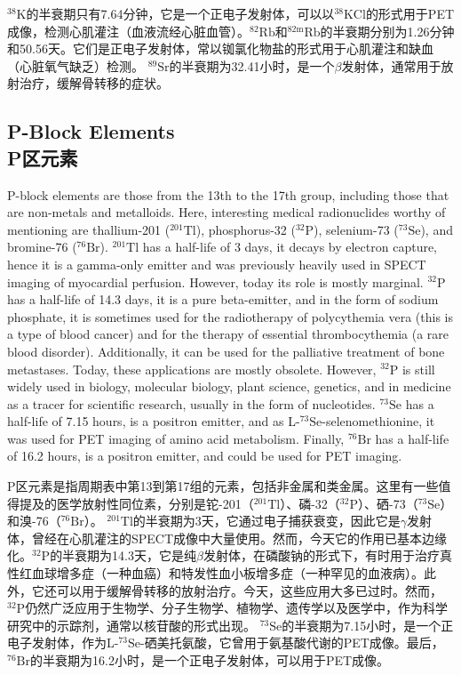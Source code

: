 \documentclass[dvipsnames, svgnames,a4paper,11pt]{article}
\begin{document}
\(\mathrm{^{38}K}\)的半衰期只有7.64分钟，它是一个正电子发射体，可以以\(\mathrm{^{38}KCl}\)的形式用于PET成像，检测心肌灌注（血液流经心脏血管）。\(\mathrm{^{82}Rb}\)和\(\mathrm{^{82m}Rb}\)的半衰期分别为1.26分钟和50.56天。它们是正电子发射体，常以铷氯化物盐的形式用于心肌灌注和缺血（心脏氧气缺乏）检测。 \(\mathrm{^{89}Sr}\)的半衰期为32.41小时，是一个$\beta$发射体，通常用于放射治疗，缓解骨转移的症状。

\subsection{P-Block Elements \\P区元素}

P-block elements are those from the 13th to the 17th group, including those that are non-metals and metalloids. Here, interesting medical radionuclides worthy of mentioning are thallium-201 (\(\mathrm{^{201}Tl}\)), phosphorus-32 (\(\mathrm{^{32}P}\)), selenium-73 (\(\mathrm{^{73}Se}\)), and bromine-76 (\(\mathrm{^{76}Br}\)). \(\mathrm{^{201}Tl}\) has a half-life of 3 days, it decays by electron capture, hence it is a gamma-only emitter and was previously heavily used in SPECT imaging of myocardial perfusion. However, today its role is mostly marginal. \(\mathrm{^{32}P}\) has a half-life of 14.3 days, it is a pure beta-emitter, and in the form of sodium phosphate, it is sometimes used for the radiotherapy of polycythemia vera (this is a type of blood cancer) and for the therapy of essential thrombocythemia (a rare blood disorder). Additionally, it can be used for the palliative treatment of bone metastases. Today, these applications are mostly obsolete. However, \(\mathrm{^{32}P}\) is still widely used in biology, molecular biology, plant science, genetics, and in medicine as a tracer for scientific research, usually in the form of nucleotides. \(\mathrm{^{73}Se}\) has a half-life of 7.15 hours, is a positron emitter, and as L-\(\mathrm{^{73}Se}\)-selenomethionine, it was used for PET imaging of amino acid metabolism. Finally, \(\mathrm{^{76}Br}\) has a half-life of 16.2 hours, is a positron emitter, and could be used for PET imaging.

P区元素是指周期表中第13到第17组的元素，包括非金属和类金属。这里有一些值得提及的医学放射性同位素，分别是铊-201（\(\mathrm{^{201}Tl}\)）、磷-32（\(\mathrm{^{32}P}\)）、硒-73（\(\mathrm{^{73}Se}\)）和溴-76（\(\mathrm{^{76}Br}\)）。 \(\mathrm{^{201}Tl}\)的半衰期为3天，它通过电子捕获衰变，因此它是$\gamma$发射体，曾经在心肌灌注的SPECT成像中大量使用。然而，今天它的作用已基本边缘化。\(\mathrm{^{32}P}\)的半衰期为14.3天，它是纯$\beta$发射体，在磷酸钠的形式下，有时用于治疗真性红血球增多症（一种血癌）和特发性血小板增多症（一种罕见的血液病）。此外，它还可以用于缓解骨转移的放射治疗。今天，这些应用大多已过时。然而，\(\mathrm{^{32}P}\)仍然广泛应用于生物学、分子生物学、植物学、遗传学以及医学中，作为科学研究中的示踪剂，通常以核苷酸的形式出现。 \(\mathrm{^{73}Se}\)的半衰期为7.15小时，是一个正电子发射体，作为L-\(\mathrm{^{73}Se}\)-硒美托氨酸，它曾用于氨基酸代谢的PET成像。最后，\(\mathrm{^{76}Br}\)的半衰期为16.2小时，是一个正电子发射体，可以用于PET成像。
\end{document}
